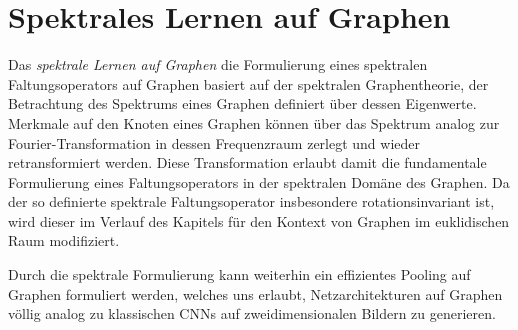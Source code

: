 \chapter{Spektrales Lernen auf Graphen}
\label{spektrales_lernen}

Das \emph{spektrale Lernen auf Graphen} \bzw{} die Formulierung eines spektralen Faltungsoperators auf Graphen basiert auf der spektralen Graphentheorie, \dhe{} der Betrachtung des Spektrums eines Graphen definiert über dessen Eigenwerte.
Merkmale auf den Knoten eines Graphen können über das Spektrum analog zur Fourier-Transformation in dessen Frequenzraum zerlegt und wieder retransformiert werden.
Diese Transformation erlaubt damit die fundamentale Formulierung eines Faltungsoperators in der spektralen Domäne des Graphen.
Da der so definierte spektrale Faltungsoperator insbesondere rotationsinvariant ist, wird dieser im Verlauf des Kapitels für den Kontext von Graphen im euklidischen Raum modifiziert.

Durch die spektrale Formulierung kann weiterhin ein effizientes Pooling auf Graphen formuliert werden, welches uns erlaubt, Netzarchitekturen auf Graphen völlig analog zu klassischen \glspl{CNN} auf zweidimensionalen Bildern zu generieren.







